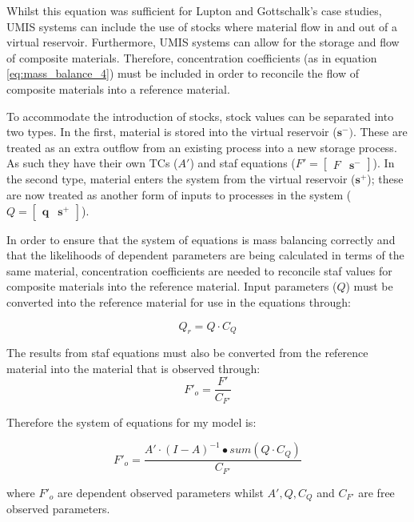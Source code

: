 \documentclass[ %
                    author={Tom Jager},
                supervisor={Dr. Daniel Schien},
                    degree={MEng},
                     title={A Bayesian Inference Engine for UMIS Structured Data},
                  subtitle={},
                      type={research},
                      year={2019} ]{dissertation}
\begin{document}
Whilst this equation was sufficient for Lupton and Gottschalk's case studies, UMIS systems can include the use of stocks where material flow in and out of a virtual reservoir. Furthermore, UMIS systems can allow for the storage and flow of composite materials. Therefore, concentration coefficients (as in equation \ref{eq:mass_balance_4}) must be included in order to reconcile the flow of composite materials into a reference material.

To accommodate the introduction of stocks, stock values can be separated into two types. In the first, material is stored into the virtual reservoir ($\bm{s^-})$. These are treated as an extra outflow from an existing process into a new storage process. As such they have their own TCs ($A'$) and staf equations ($F' = \begin{bmatrix}
F & \bm{s^-}
\end{bmatrix}$). In the second type, material enters the system from the virtual reservoir ($\bm{s^+}$); these are now treated as another form of inputs to processes in the system ($Q = \begin{bmatrix}\bm{q} & \bm{s^+}
\end{bmatrix}
$).

In order to ensure that the system of equations is mass balancing correctly and that the likelihoods of dependent parameters are being calculated in terms of the same material, concentration coefficients are needed to reconcile staf values for composite materials into the reference material. Input parameters ($Q$) must be converted into the reference material for use in the equations through:

\begin{equation}
    Q_r = Q \cdot {C_{Q}}
\end{equation}

The results from staf equations must also be converted from the reference material into the material that is observed through:
\begin{equation}
    F'_o = \frac{F'}{C_{F'}}
\end{equation}


Therefore the system of equations for my model is:

\begin{equation}
    F'_o = \frac{A' \cdot (I-A)^{-1} \bullet sum(Q \cdot C_Q)}{C_{F'}}
    \label{eq:my_model_eq}
\end{equation}

where $F'_o$ are dependent observed parameters whilst $A', Q, C_Q$ and $C_{F'}$ are free observed parameters.
\end{document}
